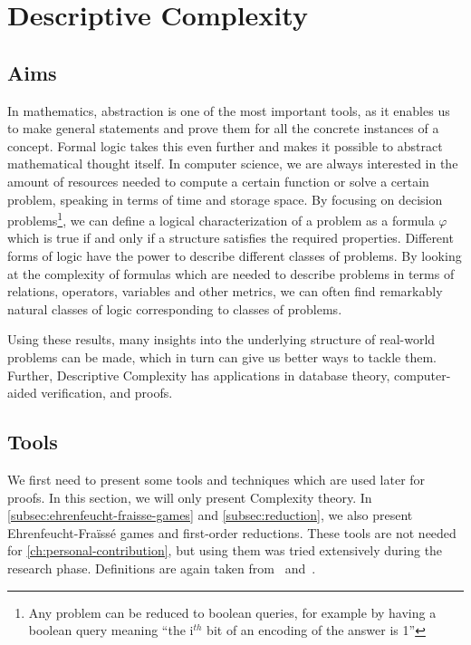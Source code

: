 

\chapter{Descriptive Complexity}\label{ch:descriptive-complexity}


\section{Aims}\label{sec:aims}

In mathematics, abstraction is one of the most important tools, as it enables us to make general statements and prove them for all the concrete instances of a concept.
Formal logic takes this even further and makes it possible to abstract mathematical thought itself.
In computer science, we are always interested in the amount of resources needed to compute a certain function or solve a certain problem, speaking in terms of time and storage space.
By focusing on decision problems\footnote{Any problem can be reduced to boolean queries, for example by having a boolean query meaning ``the i$^{th}$ bit of an encoding of the answer is 1''}, we can define a logical characterization of a problem as a formula $\varphi$ which is true if and only if a structure satisfies the required properties.
Different forms of logic have the power to describe different classes of problems.
By looking at the complexity of formulas which are needed to describe problems in terms of relations, operators, variables and other metrics, we can often find remarkably natural classes of logic corresponding to classes of problems.

Using these results, many insights into the underlying structure of real-world problems can be made, which in turn can give us better ways to tackle them.
Further, Descriptive Complexity has applications in database theory, computer-aided verification, and proofs. %

\section{Tools}\label{sec:tools}

We first need to present some tools and techniques which are used later for proofs.
In this section, we will only present Complexity theory.
In \cref{subsec:ehrenfeucht-fraisse-games} and \cref{subsec:reduction}, we also present Ehrenfeucht-Fraïssé games and first-order reductions.
These tools are not needed for \cref{ch:personal-contribution}, but using them was tried extensively during the research phase.
Definitions are again taken from~\cite{theory-cs} and~\cite{descriptive-complexity}.

